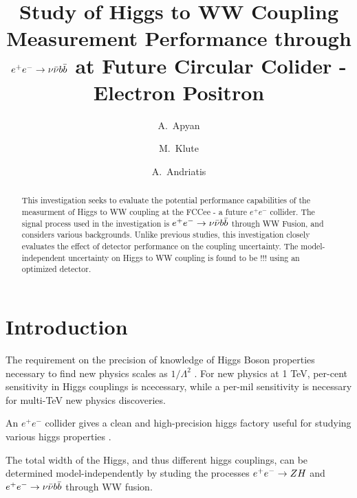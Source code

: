 \documentclass[preprintnumbers,nofootinbib,noshowpacs,eqsecnum,prd,superscriptaddress,letterpaper]{revtex4}
\begin{document}
\title{Study of Higgs to WW Coupling Measurement Performance through $e^+e^-\rightarrow\nu\bar{\nu} b\bar{b}$ at Future
Circular Colider - Electron Positron}

\author{A.~Apyan}
\author{M.~Klute}
\author{A.~Andriatis}

\begin{abstract}
This investigation seeks to evaluate the potential performance capabilities of the measurment of Higgs to WW coupling at the FCCee - a future $e^+e^-$ collider. The signal process used in the investigation is $e^+e^-\rightarrow\nu\bar{\nu} b\bar{b}$ through WW Fusion, and considers various backgrounds. Unlike previous studies, this investigation closely evaluates the effect of detector performance on the coupling uncertainty. The model-independent uncertainty on Higgs to WW coupling is found to be !!! using an optimized detector.
\end{abstract}

\maketitle
\tableofcontents
\newpage

\section{Introduction}
\label{sec:intro}


The requirement on the precision of knowledge of Higgs Boson properties necessary to find new physics scales as $1/{\Lambda^2}$ \cite{TLEP}. For new physics at 1 TeV, per-cent sensitivity in Higgs couplings is ncecessary, while a per-mil sensitivity is necessary for multi-TeV new physics discoveries. 

An $e^+e^-$ collider gives a clean and high-precision higgs factory useful for studying various higgs properties \cite{TLEP}.

The total width of the Higgs, and thus different higgs couplings, can be determined model-independently by studing the processes $e^+e^-\rightarrow Z H $ and $e^+e^-\rightarrow\nu\bar{\nu} b\bar{b}$ through WW fusion.   
\end{document}
